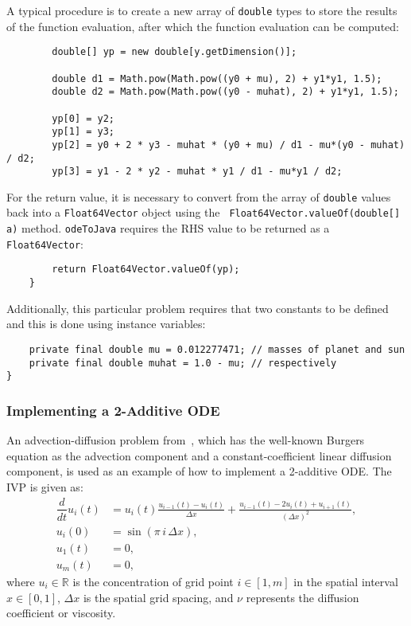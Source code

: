 \documentclass[10pt,letterpaper]{article}
\newcommand\odj{{\tt odeToJava}}
\begin{document}
A typical procedure is to create a new array of {\tt double} types to store
the results of the function evaluation, after which the function evaluation can
be computed:

\begin{lstlisting}
        double[] yp = new double[y.getDimension()];

        double d1 = Math.pow(Math.pow((y0 + mu), 2) + y1*y1, 1.5);
        double d2 = Math.pow(Math.pow((y0 - muhat), 2) + y1*y1, 1.5);

        yp[0] = y2;
        yp[1] = y3;
        yp[2] = y0 + 2 * y3 - muhat * (y0 + mu) / d1 - mu*(y0 - muhat) / d2;
        yp[3] = y1 - 2 * y2 - muhat * y1 / d1 - mu*y1 / d2;
\end{lstlisting}

For the return value, it is necessary to convert from the array of {\tt double}
values back into a {\tt Float64Vector} object using the {\tt
Float64Vector.valueOf(double[] a)} method. \odj{} requires the RHS value to be
returned as a {\tt Float64Vector}:
\begin{lstlisting}
        return Float64Vector.valueOf(yp);
    }
\end{lstlisting}
Additionally, this particular problem requires that two constants to be defined
and this is done using instance variables:
\begin{lstlisting}
    private final double mu = 0.012277471; // masses of planet and sun
    private final double muhat = 1.0 - mu; // respectively
}
\end{lstlisting}

\subsubsection{Implementing a 2-Additive ODE}\label{sec:additive}

An advection-diffusion problem from~\cite{AscherRuuthSpiteri1997}, which has the
well-known Burgers equation as the advection component and a
constant-coefficient linear diffusion component, is used as an example of how to
implement a 2-additive ODE. The IVP is given as:
\begin{align}
  \dfrac{d}{dt} u_i(t) &= u_i(t) \frac{u_{i-1}(t) - u_i(t)}{\Delta x} + \frac{u_{i-1}(t) - 2 u_i(t) + u_{i+1}(t)}{(\Delta x)^2},\nonumber\\
  u_i(0) &= \sin\left(\pi\,i\,{\Delta x}\right),\nonumber\\
  u_1(t) &= 0,\nonumber\\
  u_m(t) &= 0,
\end{align}
where $u_i \in \mathbb{R}$ is the concentration of grid point $i \in [1,m]$ in
the spatial interval $x \in [0,1]$, $\Delta x$ is the spatial grid spacing, and
$\nu$ represents the diffusion coefficient or viscosity.
\end{document}
